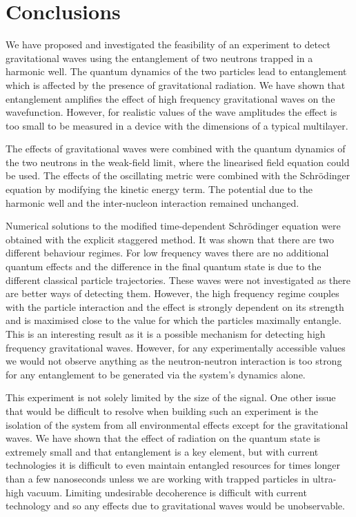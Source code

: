 \section{Conclusions}\label{sec:conclusions}

We have proposed and investigated the feasibility of an experiment to
detect gravitational waves using the entanglement of two neutrons
trapped in a harmonic well. The quantum dynamics of the two particles
lead to entanglement which is affected by the presence of
gravitational radiation. We have shown that entanglement amplifies the
effect of high frequency gravitational waves on the
wavefunction. However, for realistic values of the wave amplitudes the
effect is too small to be measured in a device with the dimensions of
a typical multilayer.

The effects of gravitational waves were combined with the quantum
dynamics of the two neutrons in the weak-field limit, where the
linearised field equation could be used. The effects of the
oscillating metric were combined with the Schr\"{o}dinger equation by
modifying the kinetic energy term. The potential due to the harmonic
well and the inter-nucleon interaction remained unchanged.

Numerical solutions to the modified time-dependent Schr\"{o}dinger
equation were obtained with the explicit staggered method. It was
shown that there are two different behaviour regimes. For low
frequency waves there are no additional quantum effects and the
difference in the final quantum state is due to the different
classical particle trajectories. These waves were not investigated as
there are better ways of detecting them. However, the high frequency
regime couples with the particle interaction and the effect is
strongly dependent on its strength and is maximised close to the value
for which the particles maximally entangle. This is an interesting
result as it is a possible mechanism for detecting high frequency
gravitational waves. However, for any experimentally accessible values
we would not observe anything as the neutron-neutron interaction is
too strong for any entanglement to be generated via the system's
dynamics alone.

This experiment is not solely limited by the size of the signal. One
other issue that would be difficult to resolve when building such an
experiment is the isolation of the system from all environmental
effects except for the gravitational waves. We have shown that the
effect of radiation on the quantum state is extremely small and that
entanglement is a key element, but with current technologies it is
difficult to even maintain entangled resources for times longer than a
few nanoseconds \cite{decoherence} unless we are working with trapped
particles in ultra-high vacuum. Limiting undesirable decoherence is
difficult with current technology and so any effects due to
gravitational waves would be unobservable.
